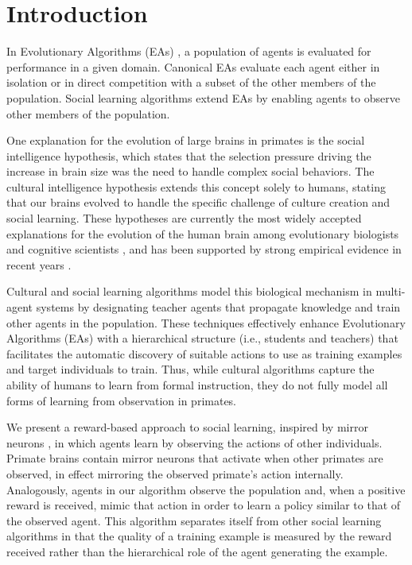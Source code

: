 \documentclass{acm_proc_article-sp}
\begin{document}
\section{Introduction}

In Evolutionary Algorithms (EAs) \cite{fogel1966artificial}, a population of agents is evaluated for performance in a given domain. Canonical EAs evaluate each agent either in isolation or in direct competition with a subset of the other members of the population. Social learning algorithms \cite{} extend EAs by enabling agents to observe other members of the population. 

One explanation for the evolution of large brains in primates is the social intelligence hypothesis, which states that the selection pressure driving the increase in brain size was the need to handle complex social behaviors. The cultural intelligence hypothesis extends this concept solely to humans, stating that our brains evolved to handle the specific challenge of culture creation and social learning. These hypotheses are currently the most widely accepted explanations for the evolution of the human brain among evolutionary biologists and cognitive scientists \cite{holekamp2007questioning}, and has been supported by strong empirical evidence in recent years \cite{herrmann2007humans}.

Cultural and social learning algorithms \cite{reynolds1994introduction} model this biological mechanism in multi-agent systems by designating teacher agents that propagate knowledge and train other agents in the population. These techniques effectively enhance Evolutionary Algorithms (EAs) with a hierarchical structure (i.e., students and teachers) that facilitates the automatic discovery of suitable actions to use as training examples and target individuals to train. Thus, while cultural algorithms capture the ability of humans to learn from formal instruction, they do not fully model all forms of learning from observation in primates.

We present a reward-based approach to social learning, inspired by mirror neurons \cite{gallese-98}, in which agents learn by observing the actions of other individuals. Primate brains contain mirror neurons that activate when other primates are observed, in effect mirroring the observed primate's action internally. Analogously, agents in our algorithm observe the population and, when a positive reward is received, mimic that action in order to learn a policy similar to that of the observed agent. This algorithm separates itself from other social learning algorithms in that the quality of a training example is measured by the reward received rather than the hierarchical role of the agent generating the example.
\end{document}
